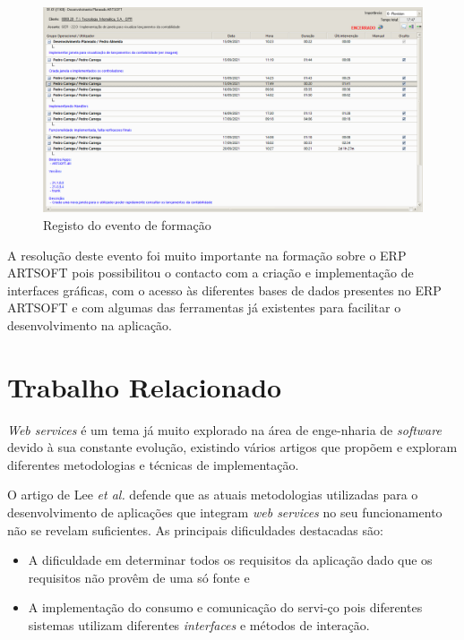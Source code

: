 \documentclass[sigplan]{acmart}
\begin{document}
\FloatBarrier
\begin{figure}[htbp]
	\centerline{\includegraphics[width=\linewidth]{figures/evento_formacao.png}}
	\caption{Registo do evento de formação}
	\label{fig2}
\end{figure}
\FloatBarrier
A resolução deste evento foi muito importante na formação sobre o ERP ARTSOFT pois possibilitou o contacto com a criação e implementação de interfaces gráficas, com o acesso às diferentes bases de dados presentes no ERP ARTSOFT e com algumas das ferramentas já existentes para facilitar o desenvolvimento na aplicação.

\section{Trabalho Relacionado} \label{sec:relatedwork}

\textit{Web services} é um tema já muito explorado na área de enge-nharia de \textit{software} devido à sua constante evolução, existindo vários artigos que propõem e exploram diferentes metodologias e técnicas de implementação.



O artigo de Lee \textit{et al.}\cite{SOAA} defende que as atuais metodologias utilizadas para o desenvolvimento de aplicações que integram \textit{web services} no seu funcionamento não se revelam suficientes. As principais dificuldades  destacadas são:
\begin{itemize}
  \item A dificuldade em determinar todos os requisitos da aplicação dado que os requisitos não provêm de uma só fonte e
  \item A implementação do consumo e comunicação do servi-ço pois diferentes sistemas utilizam diferentes \textit{interfaces} e métodos de interação.
\end{itemize}
\end{document}
